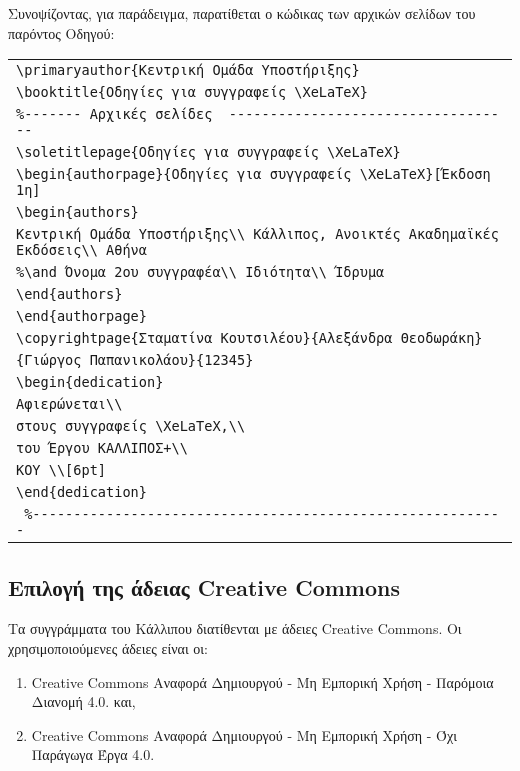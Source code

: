 \begin{refsection}
Συνοψίζοντας, για παράδειγμα, παρατίθεται ο κώδικας των αρχικών σελίδων του παρόντος Οδηγού:
\begin{center}
\begin{tabular}{l}
\verb=\primaryauthor{Κεντρική Ομάδα Υποστήριξης}=\\
\verb=\booktitle{Οδηγίες για συγγραφείς \XeLaTeX}=\\
\verb=%------- Αρχικές σελίδες  -----------------------------------=\\
\verb=\soletitlepage{Οδηγίες για συγγραφείς \XeLaTeX}=\\
\verb=\begin{authorpage}{Οδηγίες για συγγραφείς \XeLaTeX}[Έκδοση 1η]=\\
\verb=\begin{authors}=\\
\verb=Κεντρική Ομάδα Υποστήριξης\\ Κάλλιπος, Ανοικτές Ακαδημαϊκές Εκδόσεις\\ Αθήνα =\\
\verb=%\and Όνομα 2ου συγγραφέα\\ Ιδιότητα\\ Ίδρυμα=\\
\verb=\end{authors}=\\
\verb=\end{authorpage}=\\
\verb=\copyrightpage{Σταματίνα Κουτσιλέου}{Αλεξάνδρα Θεοδωράκη}=\\
\verb={Γιώργος Παπανικολάου}{12345}=\\
\verb=\begin{dedication}=\\
\verb=Αφιερώνεται\\ =\\
\verb=στους συγγραφείς \XeLaTeX,\\ =\\
\verb=του Έργου ΚΑΛΛΙΠΟΣ+\\ =\\
\verb=ΚΟΥ \\[6pt]=\\
\verb=\end{dedication} =\\
\verb= %----------------------------------------------------------=\\
\end{tabular}
\end{center}

\subsection{Επιλογή της άδειας Creative Commons}
Τα συγγράμματα του Κάλλιπου διατίθενται με άδειες Creative Commons. Οι χρησιμοποιούμενες άδειες είναι
οι:
\begin{enumerate}
\item Creative Commons Αναφορά Δημιουργού - Μη Εμπορική Χρήση - Παρόμοια Διανομή 4.0. και,
\item Creative Commons Αναφορά Δημιουργού - Μη Εμπορική Χρήση - Όχι Παράγωγα Έργα 4.0.
\end{enumerate}


\end{refsection}
